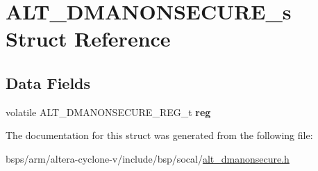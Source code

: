 \hypertarget{structALT__DMANONSECURE__s}{}\section{A\+L\+T\+\_\+\+D\+M\+A\+N\+O\+N\+S\+E\+C\+U\+R\+E\+\_\+s Struct Reference}
\label{structALT__DMANONSECURE__s}
\subsection*{Data Fields}
\begin{DoxyCompactItemize}
\item 
\mbox{\label{structALT__DMANONSECURE__s_aa05aa014bf61029e8bbdb124f070ea50}} 
volatile A\+L\+T\+\_\+\+D\+M\+A\+N\+O\+N\+S\+E\+C\+U\+R\+E\+\_\+\+R\+E\+G\+\_\+t {\bfseries reg}
\end{DoxyCompactItemize}


The documentation for this struct was generated from the following file\+:\begin{DoxyCompactItemize}
\item 
bsps/arm/altera-\/cyclone-\/v/include/bsp/socal/\mbox{\hyperlink{alt__dmanonsecure_8h}{alt\+\_\+dmanonsecure.\+h}}\end{DoxyCompactItemize}

